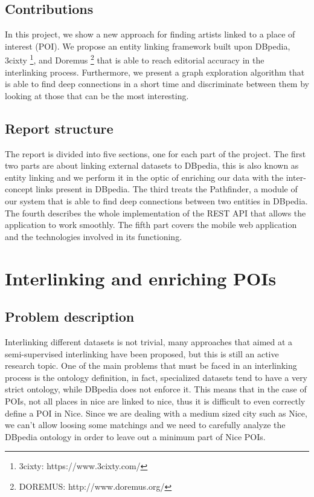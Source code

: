 \documentclass[paper=a4, fontsize=11pt]{scrartcl}
\begin{document}
\subsection{Contributions}
In this project, we show a new approach for finding artists linked to a place of interest (POI). We propose an entity linking framework built upon DBpedia, 3cixty \footnote{3cixty: https://www.3cixty.com/}, and Doremus \footnote{DOREMUS: http://www.doremus.org/} that is able to reach editorial accuracy in the interlinking process. Furthermore, we present a graph exploration algorithm that is able to find deep connections in a short time and discriminate between them by looking at those that can be the most interesting. 

\subsection{Report structure}
The report is divided into five sections, one for each part of the project. The first two parts are about linking external datasets to DBpedia, this is also known as entity linking and we perform it in the optic of enriching our data with the inter-concept links present in DBpedia.
The third treats the Pathfinder, a module of our system that is able to find deep connections between two entities in DBpedia.
The fourth describes the whole implementation of the REST API that allows the application to work smoothly.
The fifth part covers the mobile web application and the technologies involved in its functioning.

\section{Interlinking and enriching POIs}
\subsection{Problem description}
Interlinking different datasets is not trivial, many approaches that aimed at a semi-supervised interlinking have been proposed, but this is still an active research topic.
One of the main problems that must be faced in an interlinking process is the ontology definition, in fact, specialized datasets tend to have a very strict ontology, while DBpedia does not enforce it. This means that in the case of POIs, not all places in nice are linked to nice, thus it is difficult to even correctly define a POI in Nice.
Since we are dealing with a medium sized city such as Nice, we can't allow loosing some matchings and we need to carefully analyze the DBpedia ontology in order to leave out a minimum part of Nice POIs.
\end{document}
